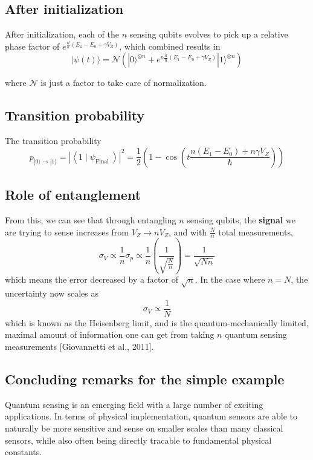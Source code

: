 \documentclass[%
oneside,                 %
final,                   %
10pt]{article}
\begin{document}
\subsection{After initialization}

After initialization, each of the $n$ sensing qubits evolves to pick up a relative phase factor of $e^{\frac{i t}{\hbar}\left(E_{1}-E_{0}+\gamma V_Z\right)}$, which combined results in
\[
|\psi(t)\rangle=\mathcal{N}\left(|0\rangle^{\otimes n}+e^{n \frac{i t}{\hbar}\left(E_{1}-E_{0}+\gamma V_Z\right)}|1\rangle^{\otimes n}\right)
\]

where $\mathcal{N}$ is just a factor to take care of normalization.

\subsection{Transition probability}

The transition probability
\[
p_{|0\rangle \rightarrow|1\rangle}=\left|\left\langle 1 \mid \psi_{\text {Final }}\right\rangle\right|^{2}=\frac{1}{2}\left(1-\cos \left(t \frac{n\left(E_{1}-E_{0}\right)+n \gamma V_Z}{\hbar}\right)\right)
\]

\subsection{Role of entanglement}

From this, we can see that through entangling $n$ sensing qubits, the
\textbf{signal} we are trying to sense increases from $V_Z \rightarrow n
V_Z$, and with $\frac{N}{n}$ total measurements,
\[
\sigma_{V} \propto \frac{1}{n} \sigma_{p} \propto \frac{1}{n}\left(\frac{1}{\sqrt{\frac{N}{n}}}\right)=\frac{1}{\sqrt{N n}}
\]
which means the error decreased by a factor of $\sqrt{n}$. In the case where $n=N$, the uncertainty now scales as
\[
\sigma_{V} \propto \frac{1}{N}
\]
which is known as the Heisenberg limit, and is the
quantum-mechanically limited, maximal amount of information one can
get from taking $n$ quantum sensing measurements [Giovannetti et al.,
2011].

\subsection{Concluding remarks for the simple example}

Quantum sensing is an emerging field with a large number of exciting
applications. In terms of physical implementation, quantum sensors are
able to naturally be more sensitive and sense on smaller scales than
many classical sensors, while also often being directly tracable to
fundamental physical constants.
\end{document}
